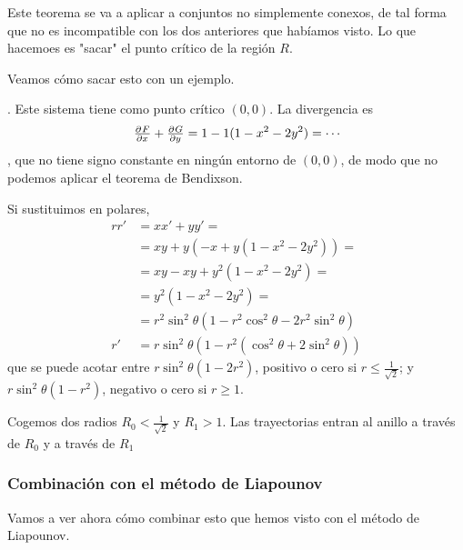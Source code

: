 Este teorema se va a aplicar a conjuntos no simplemente conexos, de tal forma que no es incompatible con los dos anteriores que habíamos visto. Lo que hacemoes es "sacar" el punto crítico de la región $R$.

Veamos cómo sacar esto con un ejemplo.

\begin{example}
. Este sistema tiene como punto crítico $(0,0)$. La divergencia es \[ \pd{F}{x} + \pd{G}{y} = 1 - 1(1-x^2-2y^2) = \cdots \], que no tiene signo constante en ningún entorno de $(0,0)$, de modo que no podemos aplicar el teorema de Bendixson.

Si sustituimos en polares, \begin{align*} rr' &= xx' + yy' = \\ &= xy + y(-x+y(1-x^2-2y^2)) = \\ &= xy-xy + y^2(1-x^2-2y^2) = \\ &= y^2(1-x^2-2y^2) = \\ &=
r^2\sin^2 θ (1-r^2\cos^2 θ -2r^2\sin^2 θ) \\
r' &= r\sin^2 θ(1-r^2(\cos^2θ + 2\sin^2θ )) \end{align*} que se puede acotar entre $r\sin^2 θ (1-2r^2)$, positivo o cero si $r ≤ \frac{1}{\sqrt{2}}$; y $r\sin^2θ (1-r^2)$, negativo o cero si $r≥ 1$.

Cogemos dos radios $R_0 < \frac{1}{\sqrt{2}}$ y $R_1 > 1$. Las trayectorias entran al anillo a través de $R_0$ y a través de $R_1$
\end{example}

\subsubsection{Combinación con el método de Liapounov}

Vamos a ver ahora cómo combinar esto que hemos visto con el método de Liapounov.

